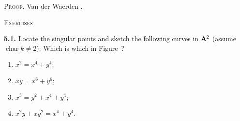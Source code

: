 {\smallskip
\noindent\textsc{Proof.} Van der Waerden .

\medskip
\noindent\textsc{Exercises}\par
\noindent\hypertarget{ex-I-5.1}{}\textbf{5.1.} Locate the singular points and sketch the following curves in $\AffSpace{2}$ (assume $\operatorname{char}k\ne2$). Which is which in Figure~?
\begin{enumerate}[label=(\alph*),leftmargin=2.4em,nosep]
\item $x^2=x^4+y^4$;
\item $xy=x^6+y^6$;
\item $x^3=y^2+x^4+y^4$;
\item $x^2y+xy^2=x^4+y^4$.
\end{enumerate}}
